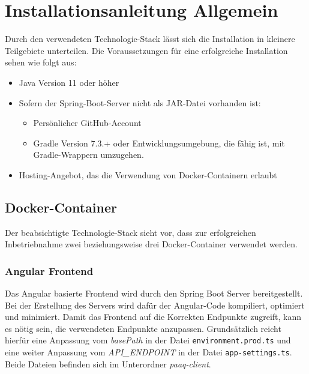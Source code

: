\documentclass[../main.tex]{subfiles}
\begin{document}
	\section{Installationsanleitung Allgemein}
	Durch den verwendeten Technologie-Stack lässt sich die Installation in kleinere Teilgebiete unterteilen. Die Voraussetzungen für eine erfolgreiche Installation sehen wie folgt aus:
	\begin{itemize}
		\item Java Version 11 oder höher
		\item Sofern der Spring-Boot-Server nicht als JAR-Datei vorhanden ist:
		\begin{itemize}
			\item Persönlicher GitHub-Account
			\item Gradle Version 7.3.+ oder Entwicklungsumgebung, die fähig ist, mit Gradle-Wrappern umzugehen.
		\end{itemize}
		\item Hosting-Angebot, das die Verwendung von Docker-Containern erlaubt
	\end{itemize}
	
	\subsection{Docker-Container}
	Der beabsichtigte Technologie-Stack sieht vor, dass zur erfolgreichen Inbetriebnahme zwei beziehungsweise drei Docker-Container verwendet werden.
	
	\subsubsection{Angular Frontend}
	\par Das Angular basierte Frontend wird durch den Spring Boot Server bereitgestellt. Bei der Erstellung des Servers wird dafür der Angular-Code kompiliert, optimiert und minimiert. Damit das Frontend auf die Korrekten Endpunkte zugreift, kann es nötig sein, die verwendeten Endpunkte anzupassen. Grundsätzlich reicht hierfür eine Anpassung vom \textit{basePath} in der Datei \texttt{environment.prod.ts} und eine weiter Anpassung vom \textit{API\_ENDPOINT} in der Datei \texttt{app-settings.ts}. Beide Dateien befinden sich im Unterordner \textit{paaq-client}.
	
\end{document}
